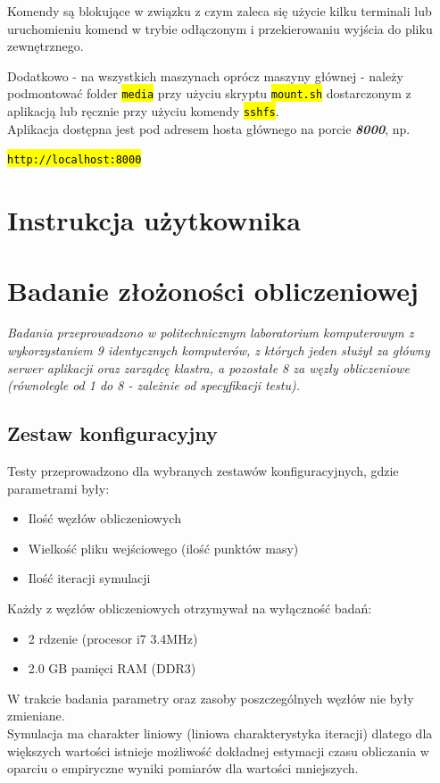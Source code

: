 \documentclass[a4paper,onecolumn,oneside,12pt]{memoir}
\begin{document}
{{Komendy są blokujące w związku z czym zaleca się użycie kilku terminali lub uruchomieniu
komend w trybie odłączonym i przekierowaniu wyjścia do pliku zewnętrznego.\vspace{2mm}

Dodatkowo - na wszystkich maszynach oprócz maszyny głównej - należy podmontować folder
\texttt{\hl{media}} przy użyciu skryptu \texttt{\hl{mount.sh}} dostarczonym z aplikacją lub ręcznie przy użyciu
komendy \texttt{\hl{sshfs}}.\\
\vspace{2mm} Aplikacja dostępna jest pod adresem hosta głównego na porcie \textbf{\textit{8000}}, np.\\
\centerline{\texttt{\hl{http://localhost:8000}}}
\chapter{Instrukcja użytkownika}


\chapter{Badanie złożoności obliczeniowej}
\emph{Badania przeprowadzono w politechnicznym laboratorium komputerowym z wykorzystaniem 9 identycznych komputerów, z których jeden służył za główny serwer aplikacji oraz zarządcę klastra, a pozostałe 8 za węzły obliczeniowe (równolegle od 1 do 8 - zależnie od specyfikacji testu).}

\section{Zestaw konfiguracyjny}

Testy przeprowadzono dla wybranych zestawów konfiguracyjnych, gdzie parametrami były:
\begin{itemize}
\item Ilość węzłów obliczeniowych
\item Wielkość pliku wejściowego (ilość punktów masy)
\item Ilość iteracji symulacji
\end{itemize}
Każdy z węzłów obliczeniowych otrzymywał na wyłączność badań:
\begin{itemize}
\item 2 rdzenie (procesor i7 3.4MHz)
\item 2.0 GB pamięci RAM (DDR3)
\end{itemize}
W trakcie badania parametry oraz zasoby poszczególnych węzłów nie były zmieniane.\\
Symulacja ma charakter liniowy (liniowa charakterystyka iteracji) dlatego dla większych wartości istnieje możliwość dokładnej estymacji czasu obliczania w oparciu o empiryczne wyniki pomiarów dla wartości mniejszych.

}}
\end{document}
